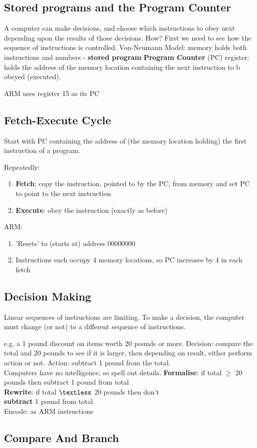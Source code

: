 \documentclass{article}
\begin{document}
\subsection{Stored programs and the Program Counter}
A computer can make decisions, and choose which instructions to obey next depending upon the results of those decisions. How? First we need to see how the sequence of instructions is controlled. Von-Neumann Model: memory holds both instructions and numbers - \textbf{stored program} \textbf{Program Counter} (PC) register: holds the address of the memory location containing the next instruction to b obeyed (executed).

ARM uses register 15 as its PC

\subsection{Fetch-Execute Cycle}
Start with PC containing the address of (the memory location holding) the first instruction of a program.

Repeatedly:
\begin{enumerate}
	\item \textbf{Fetch}: copy the instruction, pointed to by the PC, from memory and set PC to point to the next instruction
	\item \textbf{Execute}:  obey the instruction (exactly as before)
\end{enumerate}
ARM:
\begin{enumerate}
	\item 'Resets' to (starts at) address 00000000
	\item Instructions each occupy 4 memory locations, so PC increases by 4 in each fetch
\end{enumerate}

\subsection{Decision Making}
Linear sequences of instructions are limiting. To make a decision, the computer must change (or not) to a
different sequence of instructions.

e.g. a 1 pound discount on items worth 20 pounds or more.
Decision: compare the total and 20 pounds to see if it is larger, then depending on result, either perform action or not.
Action: subtract 1 pound from the total.\\

Computers have no intelligence, so spell out details.
\textbf{Formalise}: if total \(\geq\) 20 pounds then subtract 1 pound from total\\
\textbf{Rewrite}: if total \(\textless\) 20 pounds then don’t\\
\textbf{subtract} 1 pound from total\\
Encode: as ARM instructions

\subsection{Compare And Branch}
\end{document}
